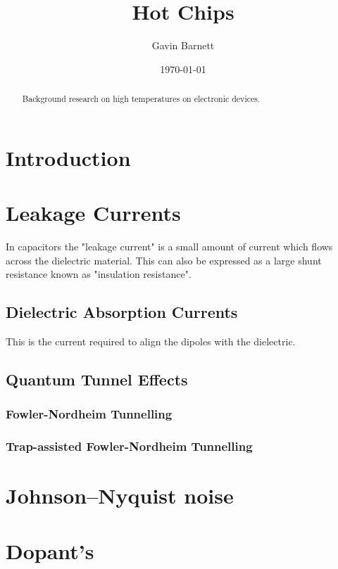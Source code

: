 \documentclass{article}
\title{Hot Chips}
\author{Gavin Barnett}
\date{\today}
\begin{document}
\maketitle

\begin{abstract}
Background research on high temperatures on electronic devices.

\end{abstract}
\maketitle

\tableofcontents

\newpage

\section{Introduction}

\section{Leakage Currents}
In capacitors the "leakage current" is a small amount of current which flows across the dielectric material. This can also be expressed as a large shunt resistance known as "insulation resistance".
\subsection{Dielectric Absorption Currents}
This is the current required to align the dipoles with the dielectric.
\subsection{Quantum Tunnel Effects}
\cite{Entner}

\subsubsection{Fowler-Nordheim Tunnelling}
\subsubsection{Trap-assisted Fowler-Nordheim Tunnelling}
\section{Johnson–Nyquist noise}

\section{Dopant's}
\end{document}
